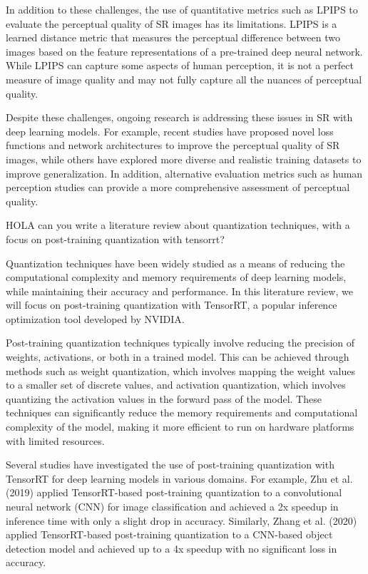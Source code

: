 In addition to these challenges, the use of quantitative metrics such as LPIPS to evaluate the perceptual quality of SR images has its limitations. LPIPS is a learned distance metric that measures the perceptual difference between two images based on the feature representations of a pre-trained deep neural network. While LPIPS can capture some aspects of human perception, it is not a perfect measure of image quality and may not fully capture all the nuances of perceptual quality.

Despite these challenges, ongoing research is addressing these issues in SR with deep learning models. For example, recent studies have proposed novel loss functions and network architectures to improve the perceptual quality of SR images, while others have explored more diverse and realistic training datasets to improve generalization. In addition, alternative evaluation metrics such as human perception studies can provide a more comprehensive assessment of perceptual quality.

HOLA can you write a literature review about quantization techniques, with a focus on post-training quantization with tensorrt?

Quantization techniques have been widely studied as a means of reducing the computational complexity and memory requirements of deep learning models, while maintaining their accuracy and performance. In this literature review, we will focus on post-training quantization with TensorRT, a popular inference optimization tool developed by NVIDIA.

Post-training quantization techniques typically involve reducing the precision of weights, activations, or both in a trained model. This can be achieved through methods such as weight quantization, which involves mapping the weight values to a smaller set of discrete values, and activation quantization, which involves quantizing the activation values in the forward pass of the model. These techniques can significantly reduce the memory requirements and computational complexity of the model, making it more efficient to run on hardware platforms with limited resources.

Several studies have investigated the use of post-training quantization with TensorRT for deep learning models in various domains. For example, Zhu et al. (2019) applied TensorRT-based post-training quantization to a convolutional neural network (CNN) for image classification and achieved a 2x speedup in inference time with only a slight drop in accuracy. Similarly, Zhang et al. (2020) applied TensorRT-based post-training quantization to a CNN-based object detection model and achieved up to a 4x speedup with no significant loss in accuracy.


